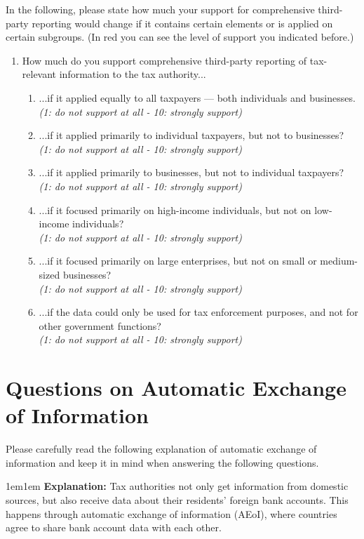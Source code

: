 \documentclass[11pt]{article}
\begin{document}
\noindent In the following, please state how much your support for comprehensive third-party reporting would change if it contains certain elements or is applied on certain subgroups. (In red you can see the level of support you indicated before.) \\  
\begin{enumerate}[resume]
    \item How much do you support comprehensive third-party reporting of tax-relevant information to the tax authority... 

\begin{enumerate}[label=\alph*)]
    \item ...if it applied equally to all taxpayers — both individuals and businesses.\\
    \textit{(1: do not support at all - 10: strongly support)}
    \item ...if it applied primarily to individual taxpayers, but not to businesses?\\
    \textit{(1: do not support at all - 10: strongly support)}
    \item ...if it applied primarily to businesses, but not to individual taxpayers?\\
    \textit{(1: do not support at all - 10: strongly support)}
    \item ...if it focused primarily on high-income individuals, but not on low-income individuals?\\
    \textit{(1: do not support at all - 10: strongly support)}
    \item ...if it focused primarily on large enterprises, but not on small or medium-sized businesses?\\
    \textit{(1: do not support at all - 10: strongly support)}
    \item ...if the data could only be used for tax enforcement purposes, and not for other government functions?\\
    \textit{(1: do not support at all - 10: strongly support)}
    \end{enumerate}
\end{enumerate}    




\section*{Questions on Automatic Exchange of Information}

Please carefully read the following explanation of automatic exchange of information and keep it in mind when answering the following questions.\\ 
\begin{adjustwidth}{1em}{1em} \textbf{Explanation:} Tax authorities not only get information from domestic sources, but also receive data about their residents’ foreign bank accounts. This happens through automatic exchange of information (AEoI), where countries agree to share bank account data with each other.  
\end{adjustwidth}
\end{document}
